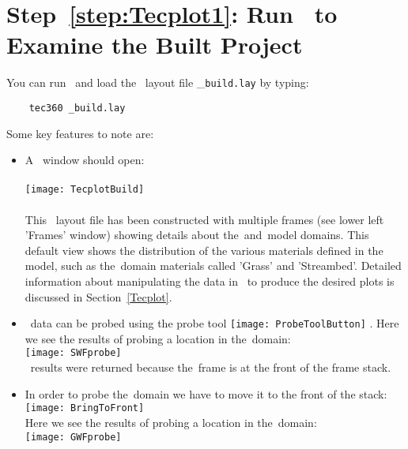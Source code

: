 \label{tecfile:TecplotUseage}
\section*{Step~\ref{step:Tecplot1}: Run \tecplot\ to Examine the Built Project}
You can run \tecplot\ and load the \tecplot\ layout file \_\verb+build.lay+ by typing:
\begin{verbatim}
    tec360 _build.lay
\end{verbatim}
Some key features to note are:
\begin{itemize}
    \item A \tecplot\ window should open: \\ \\
        \texttt{[image: TecplotBuild]} \\ \\
    This \tecplot\ layout file has been constructed with multiple frames (see lower left 'Frames' window) showing details about the\swf\ and\gwf\ model domains. This default view shows the distribution of the various materials defined in the model, such as the\swf\ domain materials called 'Grass' and 'Streambed'.  Detailed information about manipulating the data in \tecplot\ to produce the desired plots is discussed in Section~\ref{Tecplot}.
    \item \tecplot\ data can be probed using the probe tool \texttt{[image: ProbeToolButton]} .  Here we see the results of probing a location in the\swf\ domain: \\
        \texttt{[image: SWFprobe]} \\
       \swf\ results were returned because the\swf\ frame is at the front of the frame stack.
    \item In order to probe the\gwf\ domain we have to move it to the front of the stack: \\
            \texttt{[image: BringToFront]} \\
          Here we see the results of probing a location in the\gwf\ domain: \\
            \texttt{[image: GWFprobe]} \\

\end{itemize}

